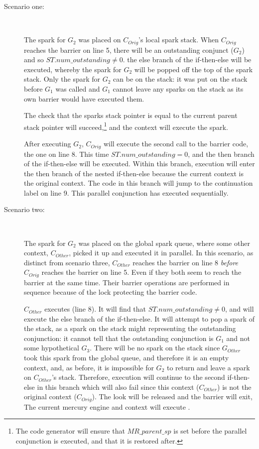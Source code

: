 \begin{description}

    \item[Scenario one:]~

    The spark for $G_2$ was placed on $C_{Orig}$'s local spark stack.
    When $C_{Orig}$ reaches the \joinandcontinue barrier on line 5,
    there will be an outstanding conjunct ($G_2$) and so
    $ST.num\_outstanding \neq 0$.
    the else branch of the if-then-else will be executed,
    whereby the spark for $G_2$ will be popped off the top of the spark
    stack.
    Only the spark for $G_2$ can be on the stack:
    it was put on the stack before $G_1$ was called and $G_1$ cannot
    leave any sparks on the stack as its own \joinandcontinue barrier
    would have executed them.
    
    The check that the sparks stack pointer is equal to the current
    parent stack pointer will succeed,\footnote{
        The code generator will ensure that $MR\_parent\_sp$ is set
        before the parallel conjunction is executed,
        and that it is restored after.}
    and the context will execute the spark.

    After executing $G_2$,
    $C_{Orig}$ will execute the second call to the barrier code,
    the one on line 8.
    This time $ST.num\_outstanding = 0$,
    and the then branch of the if-then-else will be executed.
    Within this branch,
    execution will enter the then branch of the nested if-then-else
    because
    the current context is the original context.
    The code in this branch will jump to the continuation label on line
    9.
    This parallel conjunction has executed sequentially.

    \item[Scenario two:]~

    The spark for $G_2$ was placed on the global spark queue,
    where some other context, $C_{Other}$, picked it up and executed it
    in parallel.
    In this scenario, as distinct from scenario three,
    $C_{Other}$ reaches the barrier on line 8 \emph{before}
    $C_{Orig}$ reaches the barrier on line 5.
    Even if they both seem to reach the barrier at the same time.
    Their barrier operations are performed in sequence because of the
    lock protecting the barrier code.

    $C_{Other}$ executes \joinandcontinue (line 8).
    It will find that $ST.num\_outstanding \neq 0$,
    and will execute the else branch of the if-then-else.
    It will attempt to pop a spark of the stack,
    as a spark on the stack might representing the outstanding
    conjunction:
    it cannot tell that the outstanding conjunction is $G_1$ and not some
    hypothetical $G_3$.
    There will be no spark on the stack since $G_{Other}$ took this
    spark from the global queue, and therefore it is an empty context,
    and, as before, it is impossible for $G_2$ to return and leave a
    spark on $C_{Other}$'s stack.
    Therefore, execution will continue to the second if-then-else in
    this branch which will also fail since this context ($C_{Other}$)
    is not the original context ($C_{Orig}$).
    The look will be released and the barrier will exit,
    The current mercury engine and context will execute \getglobalwork.


\end{description}
